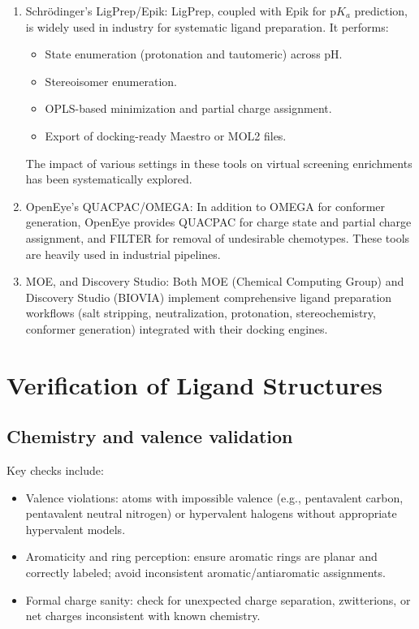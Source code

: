 \documentclass[12pt, a4paper]{article}
\begin{document}
\begin{enumerate}
\item Schr\"odinger's LigPrep/Epik: LigPrep, coupled with Epik for p$K_a$ prediction, is widely used in industry for systematic ligand preparation.\cite{CH6_Sastry2013} It performs:
\begin{itemize}
  \item State enumeration (protonation and tautomeric) across pH.
  \item Stereoisomer enumeration.
  \item OPLS-based minimization and partial charge assignment.
  \item Export of docking-ready Maestro or MOL2 files.
\end{itemize}
The impact of various settings in these tools on virtual screening enrichments has been systematically explored.\cite{CH6_Sastry2013}

\item OpenEye's QUACPAC/OMEGA: In addition to OMEGA for conformer generation, OpenEye provides QUACPAC for charge state and partial charge assignment, and FILTER for removal of undesirable chemotypes.\cite{CH6_Hawkins2010} These tools are heavily used in industrial pipelines.

\item MOE, and Discovery Studio: Both MOE (Chemical Computing Group) and Discovery Studio (BIOVIA) implement comprehensive ligand preparation workflows (salt stripping, neutralization, protonation, stereochemistry, conformer generation) integrated with their docking engines.
\end{enumerate}

\section{Verification of Ligand Structures}

\subsection{Chemistry and valence validation}

Key checks include:
\begin{itemize}
  \item Valence violations: atoms with impossible valence (e.g., pentavalent carbon, pentavalent neutral nitrogen) or hypervalent halogens without appropriate hypervalent models.
  \item Aromaticity and ring perception: ensure aromatic rings are planar and correctly labeled; avoid inconsistent aromatic/antiaromatic assignments.
  \item Formal charge sanity: check for unexpected charge separation, zwitterions, or net charges inconsistent with known chemistry.
\end{itemize}
\end{document}
